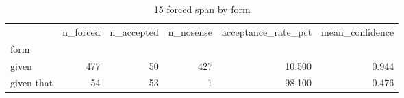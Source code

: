 \begin{table}
\caption{15 forced span by form}
\begin{tabular}{lrrrrr}
\toprule
 & n\_forced & n\_accepted & n\_nosense & acceptance\_rate\_pct & mean\_confidence \\
form &  &  &  &  &  \\
\midrule
given & 477 & 50 & 427 & 10.500 & 0.944 \\
given that & 54 & 53 & 1 & 98.100 & 0.476 \\
\bottomrule
\end{tabular}
\end{table}
